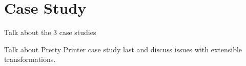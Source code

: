 \section{Case Study}

Talk about the 3 case studies

Talk about Pretty Printer case study last and discuss issues with 
extensible transformations.
